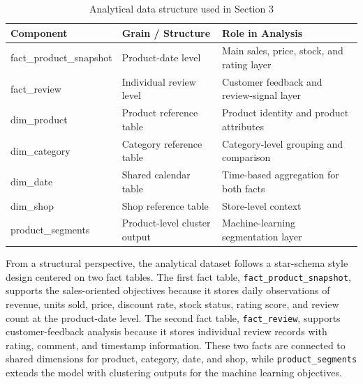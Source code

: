 \begin{table}[H]
\centering
\small
\renewcommand{\arraystretch}{1.3}
\begin{tabularx}{\textwidth}{|>{\ttfamily}p{}|p{}|X|}
\hline
\textbf{Component} & \textbf{Grain / Structure} & \textbf{Role in Analysis} \\ \hline
fact\_product\_snapshot & Product-date level & Main sales, price, stock, and rating layer \\ \hline
fact\_review & Individual review level & Customer feedback and review-signal layer \\ \hline
dim\_product & Product reference table & Product identity and product attributes \\ \hline
dim\_category & Category reference table & Category-level grouping and comparison \\ \hline
dim\_date & Shared calendar table & Time-based aggregation for both facts \\ \hline
dim\_shop & Shop reference table & Store-level context \\ \hline
product\_segments & Product-level cluster output & Machine-learning segmentation layer \\ \hline
\end{tabularx}
\caption{Analytical data structure used in Section 3}
\label{tab:data-structure}
\end{table}

From a structural perspective, the analytical dataset follows a star-schema style design centered on two fact tables. The first fact table, \texttt{fact\_product\_snapshot}, supports the sales-oriented objectives because it stores daily observations of revenue, units sold, price, discount rate, stock status, rating score, and review count at the product-date level. The second fact table, \texttt{fact\_review}, supports customer-feedback analysis because it stores individual review records with rating, comment, and timestamp information. These two facts are connected to shared dimensions for product, category, date, and shop, while \texttt{product\_segments} extends the model with clustering outputs for the machine learning objectives.

